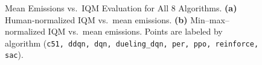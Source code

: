 \begin{figure} 
	\centering
	\quad
	\caption{Mean Emissions vs.\ IQM Evaluation for All 8 Algorithms.
		\textbf{(a)} Human‐normalized IQM vs.\ mean emissions. 
		\textbf{(b)} Min--max–normalized IQM vs.\ mean emissions. 
		Points are labeled by algorithm (\texttt{c51, ddqn, dqn, dueling\_dqn, per, ppo, reinforce, sac}).}
	\label{fig:scatter_all_iqmean}
\end{figure}

